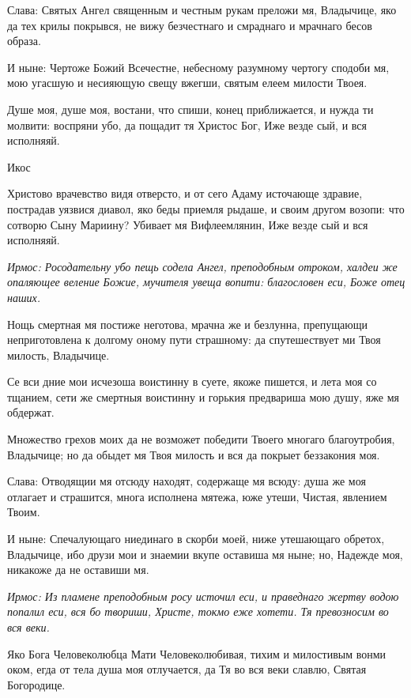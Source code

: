 Слава: Святых Ангел священным и честным рукам преложи мя, Владычице, яко да тех крилы покрывся, не вижу безчестнаго и смраднаго и мрачнаго бесов образа. 

И ныне: Чертоже Божий Всечестне, небесному разумному чертогу сподоби мя, мою угасшую и несияющую свещу вжегши, святым елеем милости Твоея.




Душе моя, душе моя, востани, что спиши, конец приближается, и нужда ти молвити: воспряни убо, да пощадит тя Христос Бог, Иже везде сый, и вся исполняяй. 

Икос 

Христово врачевство видя отверсто, и от сего Адаму источающе здравие, пострадав уязвися диавол, яко беды приемля рыдаше, и своим другом возопи: что сотворю Сыну Мариину? Убивает мя Вифлеемлянин, Иже везде сый и вся исполняяй.




\itshape Ирмос:\normalfont{} Росодательну убо пещь содела Ангел, преподобным отроком, халдеи же опаляющее веление Божие, мучителя увеща вопити: благословен еси, Боже отец наших. 

Нощь смертная мя постиже неготова, мрачна же и безлунна, препущающи неприготовлена к долгому оному пути страшному: да спутешествует ми Твоя милость, Владычице. 

Се вси дние мои исчезоша воистинну в суете, якоже пишется, и лета моя со тщанием, сети же смертныя воистинну и горькия предвариша мою душу, яже мя обдержат. 

Множество грехов моих да не возможет победити Твоего многаго благоутробия, Владычице; но да обыдет мя Твоя милость и вся да покрыет беззакония моя. 

Слава: Отводящии мя отсюду находят, содержаще мя всюду: душа же моя отлагает и страшится, многа исполнена мятежа, юже утеши, Чистая, явлением Твоим. 

И ныне: Спечалующаго ниединаго в скорби моей, ниже утешающаго обретох, Владычице, ибо друзи мои и знаемии вкупе оставиша мя ныне; но, Надежде моя, никакоже да не оставиши мя.




\itshape Ирмос:\normalfont{} Из пламене преподобным росу источил еси, и праведнаго жертву водою попалил еси, вся бо твориши, Христе, токмо еже хотети. Тя превозносим во вся веки. 

Яко Бога Человеколюбца Мати Человеколюбивая, тихим и милостивым вонми оком, егда от тела душа моя отлучается, да Тя во вся веки славлю, Святая Богородице. 

